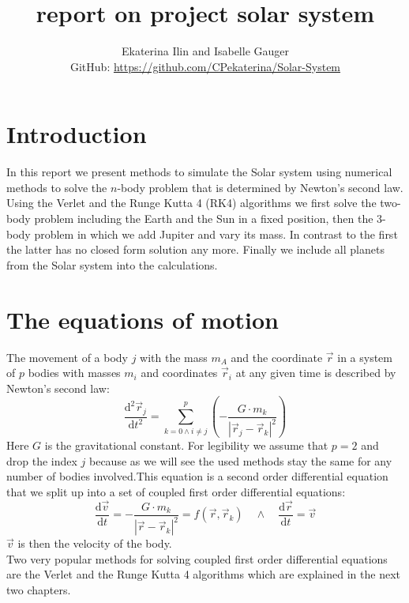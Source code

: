 \documentclass[11pt,a4wide]{article}
\begin{document}
\title{report on project solar system}
\author{Ekaterina Ilin and Isabelle Gauger\\GitHub: \url{https://github.com/CPekaterina/Solar-System}
}
\maketitle
\tableofcontents
\newpage

\section{Introduction}
In this report we present methods to simulate the Solar system using numerical methods to solve the $n$-body problem that is determined by Newton's second law.  Using the Verlet and the Runge Kutta 4 (RK4) algorithms we first solve the two-body problem including the Earth and the Sun in a fixed position, then the 3-body problem in which we add Jupiter and vary its mass. In contrast to the first the latter has no closed form solution any more. Finally we include all planets from the Solar system into the calculations.
\section{The equations of motion}
The movement of a body $j$ with the mass $m_A$ and the coordinate $\vec{r}$ in a system of $p$ bodies with masses $m_i$  and coordinates $\vec{r}_i$ at any given time is described by Newton's second law:
\begin{equation}
\dfrac{\mathrm d^2 \vec{r}_j}{\mathrm d t^2}=\displaystyle\sum_{k=0 \wedge i\neq j}^{p}\left(-\dfrac{G\cdot m_k}{\left|\vec{r}_j-\vec{r}_k\right|^2}\right)
\label{eq:Newton}
\end{equation}
Here $G$ is the gravitational constant.  For legibility we assume that $p=2$  and drop the index $j$ because as we will see the used methods stay the same for any number of bodies involved.This equation is a second order differential equation that we split up into a set of coupled first order differential equations:
\begin{equation}
\dfrac{\mathrm d\vec{v}}{\mathrm d t}=-\dfrac{G\cdot m_k}{\left|\vec{r}-\vec{r}_k\right|^2}=f(\vec{r},\vec{r}_k)\quad\wedge\quad \dfrac{\mathrm d\vec{r}}{\mathrm d t}=\vec{v}
\label{eq:cNewton}
\end{equation}
$\vec{v}$ is then the velocity of the body. 
\\
Two very popular methods for solving coupled first order differential equations are the Verlet and the Runge Kutta 4 algorithms which are explained in the next two chapters.
\end{document}
